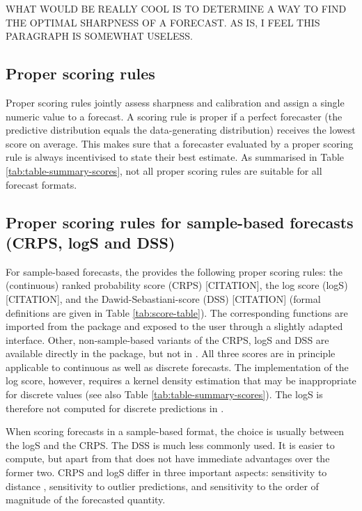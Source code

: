 \documentclass[article,shortnames]{jss}
\begin{document}
WHAT WOULD BE REALLY COOL IS TO DETERMINE A WAY TO FIND THE OPTIMAL SHARPNESS OF A FORECAST. AS IS, I FEEL THIS PARAGRAPH IS SOMEWHAT USELESS. 




\subsection{Proper scoring rules}
Proper scoring rules \citep{gneitingStrictlyProperScoring2007} jointly assess sharpness and calibration and assign a single numeric value to a forecast. A scoring rule is proper if a perfect forecaster (the predictive distribution equals the data-generating distribution) receives the lowest score on average. This makes sure that a forecaster evaluated by a proper scoring rule is always incentivised to state their best estimate. As summarised in Table \ref{tab:table-summary-scores}, not all proper scoring rules are suitable for all forecast formats. 

\subsection{Proper scoring rules for sample-based forecasts (CRPS, logS and DSS)}
For sample-based forecasts, the  provides the following proper scoring rules: the (continuous) ranked probability score (CRPS) [CITATION], the log score (logS) [CITATION], and the Dawid-Sebastiani-score (DSS) [CITATION] (formal definitions are given in Table \ref{tab:score-table}). The corresponding functions are imported from the  package and exposed to the user through a slightly adapted interface. Other, non-sample-based variants of the CRPS, logS and DSS are available directly in the  package, but not in . All three scores are in principle applicable to continuous as well as discrete forecasts. The  implementation of the log score, however, requires a kernel density estimation that may be inappropriate for discrete values (see also Table \ref{tab:table-summary-scores}). The logS is therefore not computed for discrete predictions in . 

When scoring forecasts in a sample-based format, the choice is usually between the logS and the CRPS. The DSS is much less commonly used. It is easier to compute, but apart from that does not have immediate advantages over the former two. CRPS and logS differ in three important aspects: sensitivity to distance \cite{winklerScoringRulesEvaluation1996}, sensitivity to outlier predictions, and sensitivity to the order of magnitude of the forecasted quantity. 
\end{document}
